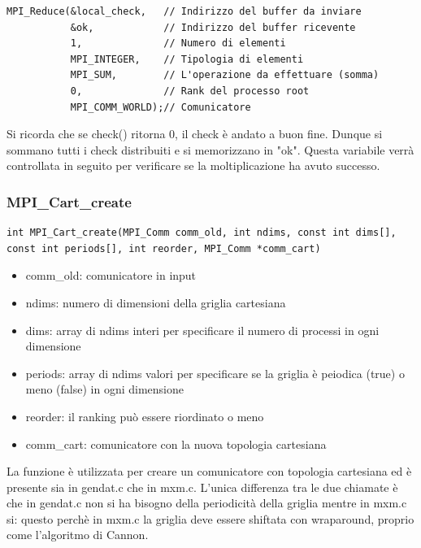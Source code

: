 \begin{lstlisting}
MPI_Reduce(&local_check,   // Indirizzo del buffer da inviare
           &ok,            // Indirizzo del buffer ricevente
           1,              // Numero di elementi
           MPI_INTEGER,    // Tipologia di elementi
           MPI_SUM,        // L'operazione da effettuare (somma)
           0,              // Rank del processo root
           MPI_COMM_WORLD);// Comunicatore
\end{lstlisting}

Si ricorda che se check() ritorna 0, il check \`{e} andato a buon fine. Dunque si sommano tutti i check distribuiti e si memorizzano in "ok". Questa variabile verr\`{a} controllata in seguito per verificare se la moltiplicazione ha avuto successo.

\subsubsection{MPI\_Cart\_create}
\begin{lstlisting}
int MPI_Cart_create(MPI_Comm comm_old, int ndims, const int dims[], const int periods[], int reorder, MPI_Comm *comm_cart)
\end{lstlisting}
\begin{itemize}
  \item comm\_old: comunicatore in input
  \item ndims: numero di dimensioni della griglia cartesiana
  \item dims: array di ndims interi per specificare il numero di processi in ogni dimensione
  \item periods: array di ndims valori per specificare se la griglia \`{e} peiodica (true) o meno (false) in ogni dimensione
  \item reorder: il ranking pu\`{o} essere riordinato o meno
  \item comm\_cart: comunicatore con la nuova topologia cartesiana
\end{itemize}

La funzione \`{e} utilizzata per creare un comunicatore con topologia cartesiana ed \`{e} presente sia in gendat.c che in mxm.c. L'unica differenza tra le due chiamate \`{e} che in gendat.c non si ha bisogno della periodicit\`{a} della griglia mentre in mxm.c si: questo perch\`{e} in mxm.c la griglia deve essere shiftata con wraparound, proprio come l'algoritmo di Cannon.

